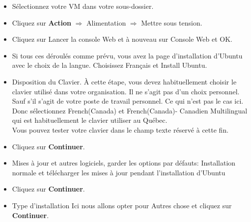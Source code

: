 	\begin{itemize}
		\item  Sélectionnez votre VM dans votre sous-dossier.
		\item Cliquez sur \textbf{Action} \(\Rightarrow\) Alimentation \(\Rightarrow\) Mettre sous tension.\\
		
		\vspace{1pt}
		
		
		\vspace{10pt}  
		
		\item Cliquez sur Lancer la console Web et à nouveau sur Console Web et OK.
		\item Si tous ces déroulés comme prévu, vous avez la page d'installation d'Ubuntu avec le choix de la langue.  Choisissez {\color{blue}Français} et {\color{blue}Install Ubuntu}.
		\item Disposition du Clavier. À cette étape, vous devez habituellement choisir le clavier utilisé dans votre organisation. Il ne s'agit pas d'un choix personnel. Sauf s'il s'agit de votre poste de travail personnel. Ce qui n'est pas le cas ici. 
		Donc sélectionnez {\color{blue}French(Canada)} et {\color{blue}French(Canada)- Canadien Multilingual} qui est habituellement le clavier utiliser au Québec.\\
		Vous pouvez tester votre clavier dans le champ texte réservé à cette fin.
		\item Cliquez sur \textbf{Continuer}.
		\item {\color{blue}Mises à jour et autres logiciels}, garder les options par défauts: {\color{blue}Installation normale} et {\color{blue}télécharger les mises à jour pendant l'installation d'Ubuntu}
		\item Cliquez sur \textbf{Continuer}.
		\item {\color{blue}Type d'installation} Ici nous allons opter pour {\color{blue} Autres chose} et cliquez sur \textbf{Continuer}.
	\end{itemize}
